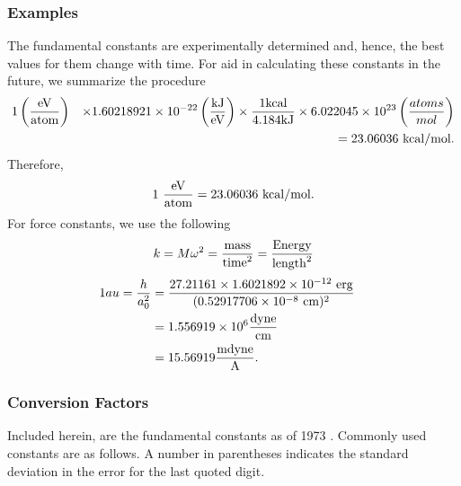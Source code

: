 \subsubsection{Examples}
    
The fundamental constants are experimentally determined and, hence,
the best values for them change with time. For aid in calculating
these constants in the future, we summarize the procedure
\begin{eqnarray}
1 \left( {\mathrm{eV} \over \mathrm{atom}} \right) 
   &&\times 1.60218921 \times 10^{-22} 
   \left({\mathrm{kJ} \over \mathrm{eV}}\right) 
   \times {1 \mathrm{kcal} \over 4.184\mathrm{kJ}}
   \times 6.022045\times 10^{23} \left( {atoms \over mol} \right) \cr
   && = 23.06036\ \mathrm{kcal}/\mathrm{mol}.
\end{eqnarray}
Therefore,
\begin{equation}
1\ {\mathrm{eV} \over \mathrm{atom}} = 23.06036\ \mathrm{kcal}/\mathrm{mol}.
\end{equation}
For force constants, we use the following
\begin{equation}
k = M \omega^2 = {\mathrm{mass} \over \mathrm{time}^2} 
    = {\mathrm{Energy} \over \mathrm{length}^2}
\end{equation}
\begin{eqnarray}
1 au = {h \over a_0^2} &= {27.21161 \times 1.6021892 \times 10^{-12}\
  \mathrm{erg} \over (0.52917706 \times 10^{-8}\ \mathrm{cm})^2}\cr
&= 1.556919 \times 10^6 {\mathrm{dyne} \over \mathrm{cm}}\cr
&= 15.56919 {\mathrm{mdyne} \over \mathrm{A}}.\cr
\end{eqnarray}

\subsubsection{Conversion Factors}
    
Included herein, are the fundamental constants as of 1973
\cite{cohen_taylor}. Commonly used constants are as follows. A number
in parentheses indicates the standard deviation in the error for the
last quoted digit.


